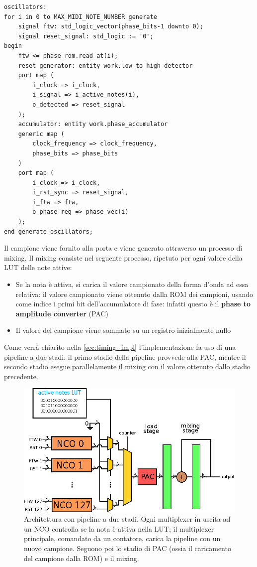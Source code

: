 \pagebreak

\begin{verbatim}
oscillators:
for i in 0 to MAX_MIDI_NOTE_NUMBER generate
    signal ftw: std_logic_vector(phase_bits-1 downto 0);
    signal reset_signal: std_logic := '0';
begin
    ftw <= phase_rom.read_at(i);
    reset_generator: entity work.low_to_high_detector
    port map (
        i_clock => i_clock,
        i_signal => i_active_notes(i),
        o_detected => reset_signal
    );
    accumulator: entity work.phase_accumulator
    generic map (
        clock_frequency => clock_frequency,
        phase_bits => phase_bits
    )
    port map (
        i_clock => i_clock,
        i_rst_sync => reset_signal,
        i_ftw => ftw,
        o_phase_reg => phase_vec(i)
    );
end generate oscillators;
\end{verbatim}

Il campione viene fornito alla porta  e viene generato attraverso un processo di mixing.
Il mixing consiste nel seguente processo, ripetuto per ogni valore della LUT delle note attive:
\begin{itemize}
    \item Se la nota è attiva, si carica il valore campionato della forma d'onda ad essa relativa:
          il valore campionato viene ottenuto dalla ROM dei campioni, usando come indice
          i primi  bit dell'accumulatore di fase: infatti questo è il
          \textbf{phase to amplitude converter} (PAC)
    \item Il valore del campione viene sommato su un registro inizialmente nullo
\end{itemize} 

Come verrà chiarito nella \cref{sec:timing_impl}
l'implementazione fa uso di una pipeline a due stadi:
il primo stadio della pipeline provvede alla PAC, mentre il secondo stadio
esegue parallelamente il mixing con il valore ottenuto dallo stadio
precedente.
\begin{figure}[H]
	\centering
	\def\svgwidth{\columnwidth}
	\includegraphics[width=\columnwidth]{TeX_files/synth_engine.eps}
	\caption{Architettura con pipeline a due stadi. Ogni multiplexer
	 in uscita ad un NCO controlla se la nota è attiva nella LUT; il
     multiplexer principale, comandato da un contatore, carica la pipeline
     con un nuovo campione. Seguono poi lo stadio di PAC (ossia il caricamento del campione dalla ROM) e il mixing.}
\end{figure}

